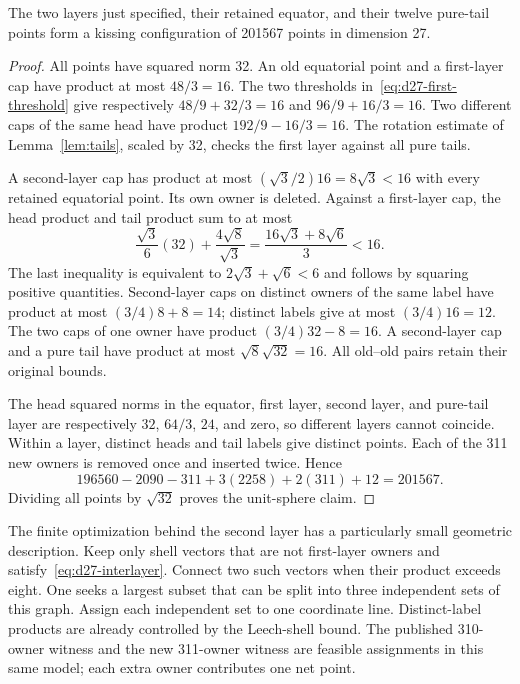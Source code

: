 \begin{theorem}\label{thm:d27}
The two layers just specified, their retained equator, and their
twelve pure-tail points form a kissing configuration of 201567
points in dimension 27.
\end{theorem}
\begin{proof}
All points have squared norm 32. An old equatorial point and a
first-layer cap have product at most $48/3=16$. The two
thresholds in~\eqref{eq:d27-first-threshold} give respectively
$48/9+32/3=16$ and $96/9+16/3=16$.
Two different caps of the same head have product
$192/9-16/3=16$.
The rotation estimate of Lemma~\ref{lem:tails}, scaled by 32,
checks the first layer against all pure tails.

A second-layer cap has product at most
$(\sqrt3/2)16=8\sqrt3<16$ with every retained equatorial
point. Its own owner is deleted. Against a first-layer cap, the
head product and tail product sum to at most
\[
 \frac{\sqrt3}{6}(32)+\frac{4\sqrt8}{\sqrt3}
 =\frac{16\sqrt3+8\sqrt6}{3}<16.
\]
The last inequality is equivalent to
$2\sqrt3+\sqrt6<6$ and follows by squaring positive quantities.
Second-layer caps on distinct owners of the same label have
product at most $(3/4)8+8=14$; distinct labels give at most
$(3/4)16=12$. The two caps of one owner have product
$(3/4)32-8=16$. A second-layer cap and a pure tail have
product at most $\sqrt8\sqrt{32}=16$.
All old--old pairs retain their original bounds.

The head squared norms in the equator, first layer, second layer,
and pure-tail layer are respectively $32$, $64/3$, $24$, and zero,
so different layers cannot coincide. Within a layer, distinct
heads and tail labels give distinct points. Each of the 311
new owners is removed once and inserted twice. Hence
\[
 196560-2090-311+3(2258)+2(311)+12=201567.
\]
Dividing all points by $\sqrt{32}$ proves the unit-sphere claim.
\end{proof}

The finite optimization behind the second layer has a particularly
small geometric description. Keep only shell vectors that are
not first-layer owners and satisfy~\eqref{eq:d27-interlayer}.
Connect two such vectors when their product exceeds eight.
One seeks a largest subset that can be split into three independent
sets of this graph. Assign each independent set to one coordinate
line. Distinct-label products are already controlled by the
Leech-shell bound. The published 310-owner witness and the new
311-owner witness are feasible assignments in this same model;
each extra owner contributes one net point.
